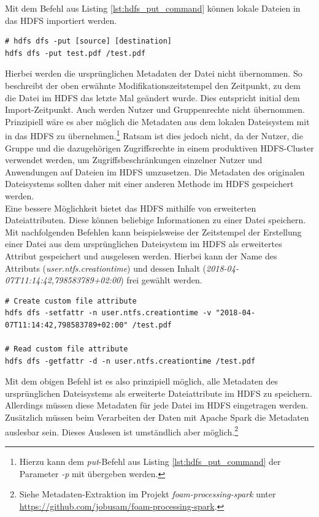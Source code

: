\noindent
Mit dem Befehl aus Listing \ref{lst:hdfs_put_command} können lokale Dateien in das HDFS importiert werden. 
\begin{lstlisting}[label={lst:hdfs_put_command},caption= Befehl zum Speichern einer Datei im HDFS,captionpos=b,frame=single,style=customshell]
# hdfs dfs -put [source] [destination]
hdfs dfs -put test.pdf /test.pdf
\end{lstlisting}

\noindent
Hierbei werden die ursprünglichen Metadaten der Datei nicht übernommen. So beschreibt der oben erwähnte Modifikationszeitstempel den Zeitpunkt, zu dem die Datei im HDFS das letzte Mal geändert wurde. Dies entspricht initial dem Import-Zeitpunkt. Auch werden Nutzer und Gruppenrechte nicht übernommen. Prinzipiell wäre es aber möglich die Metadaten aus dem lokalen Dateisystem mit in das HDFS zu übernehmen.\footnote{Hierzu kann dem \textit{put}-Befehl aus Listing \ref{lst:hdfs_put_command} der Parameter \textit{-p} mit übergeben werden.} Ratsam ist dies jedoch nicht, da der Nutzer, die Gruppe und die dazugehörigen Zugriffsrechte in einem produktiven HDFS-Cluster verwendet werden, um Zugriffsbeschränkungen einzelner Nutzer und Anwendungen auf Dateien im HDFS umzusetzen. Die Metadaten des originalen Dateisystems sollten daher mit einer anderen Methode im HDFS gespeichert werden.\\

\noindent
Eine bessere Möglichkeit bietet das HDFS mithilfe von erweiterten Dateiattributen. Diese können beliebige Informationen zu einer Datei speichern. Mit nachfolgenden Befehlen kann beispielsweise der Zeitstempel der Erstellung einer Datei aus dem ursprünglichen Dateisystem im HDFS als erweitertes Attribut gespeichert und ausgelesen werden. Hierbei kann der Name des Attributs (\textit{user.ntfs.creationtime}) und dessen Inhalt (\textit{2018-04-07T11:14:42,798583789+02:00}) frei gewählt werden.
\begin{lstlisting}[label={lst:hdfs_fattr_command},caption= Befehl zum Hinzufügen und Auslesen von Metadaten,captionpos=b,frame=single,style=customshell]
# Create custom file attribute
hdfs dfs -setfattr -n user.ntfs.creationtime -v "2018-04-07T11:14:42,798583789+02:00" /test.pdf

# Read custom file attribute
hdfs dfs -getfattr -d -n user.ntfs.creationtime /test.pdf
\end{lstlisting}

\noindent
Mit dem obigen Befehl ist es also prinzipiell möglich, alle Metadaten des ursprünglichen Dateisystems als erweiterte Dateiattribute im HDFS zu speichern. Allerdings müssen diese Metadaten für jede Datei im HDFS eingetragen werden.\\
Zusätzlich müssen beim Verarbeiten der Daten mit Apache Spark die Metadaten auslesbar sein. Dieses Auslesen ist umständlich aber möglich.\footnote{Siehe Metadaten-Extraktion im Projekt \textit{foam-processing-spark} unter \url{https://github.com/jobusam/foam-processing-spark}.}\\

